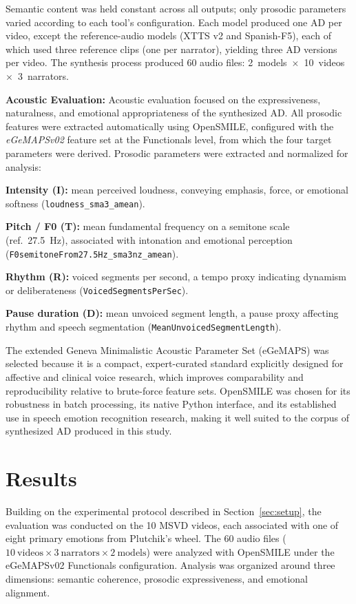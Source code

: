 \documentclass[pdflatex,iicol,sn-mathphys-num]{sn-jnl}%
\theoremstyle{thmstyleone}%
\theoremstyle{thmstyletwo}%
\theoremstyle{thmstylethree}%
\begin{document}
Semantic content was held constant across all outputs; only prosodic parameters varied according to each tool's configuration. Each model produced one AD per video, except the reference-audio models (XTTS v2 and Spanish-F5), each of which used three reference clips (one per narrator), yielding three AD versions per video. The synthesis process produced 60 audio files: 2~models~$\times$~10~videos~$\times$~3~narrators.

\textbf{Acoustic Evaluation:} Acoustic evaluation focused on the expressiveness, naturalness, and emotional appropriateness of the synthesized AD. All prosodic features were extracted automatically using OpenSMILE, configured with the \textit{eGeMAPSv02} feature set at the Functionals level, from which the four target parameters were derived. Prosodic parameters were extracted and normalized for analysis:

\textbf{Intensity (I):} mean perceived loudness, conveying emphasis, force, or emotional softness (\texttt{loudness\_sma3\_amean}).

\textbf{Pitch / F0 (T):} mean fundamental frequency on a semitone scale (ref.\ 27.5~Hz), associated with intonation and emotional perception (\texttt{F0semitoneFrom27.5Hz\_sma3nz\_amean}).

\textbf{Rhythm (R):} voiced segments per second, a tempo proxy indicating dynamism or deliberateness (\texttt{VoicedSegmentsPerSec}).

\textbf{Pause duration (D):} mean unvoiced segment length, a pause proxy affecting rhythm and speech segmentation (\texttt{MeanUnvoicedSegmentLength}).

The extended Geneva Minimalistic Acoustic Parameter Set (eGeMAPS) was selected because it is a compact, expert-curated standard explicitly designed for affective and clinical voice research, which improves comparability and reproducibility relative to brute-force feature sets. OpenSMILE was chosen for its robustness in batch processing, its native Python interface, and its established use in speech emotion recognition research, making it well suited to the corpus of synthesized AD produced in this study.

\section{Results}
\label{sec:results}

Building on the experimental protocol described in Section~\ref{sec:setup}, the evaluation was conducted on the 10 MSVD videos, each associated with one of eight primary emotions from Plutchik's wheel. The 60 audio files ($10~\text{videos} \times 3~\text{narrators} \times 2~\text{models}$) were analyzed with OpenSMILE under the eGeMAPSv02 Functionals configuration. Analysis was organized around three dimensions: semantic coherence, prosodic expressiveness, and emotional alignment.
\end{document}

